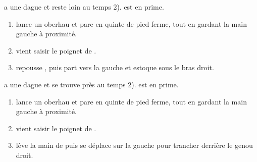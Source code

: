\begin{technique}

\A a une dague et reste loin au temps 2).
\D est en prime.

\begin{enumerate}
	\item \A lance un oberhau et \D pare en quinte de pied ferme, tout en gardant la main gauche à proximité.
	
	\item \D vient saisir le poignet de \A.
	
	\item \D repousse \A, puis part vers la gauche et estoque sous le bras droit.
\end{enumerate}

\end{technique}


\begin{technique}

\A a une dague et se trouve près au temps 2).
\D est en prime.

\begin{enumerate}
	\item \A lance un oberhau et \D pare en quinte de pied ferme, tout en gardant la main gauche à proximité.
	
	\item \D vient saisir le poignet de \A.
	
	\item \D lève la main de \A puis se déplace sur la gauche pour trancher derrière le genou droit.
\end{enumerate}

\end{technique}

